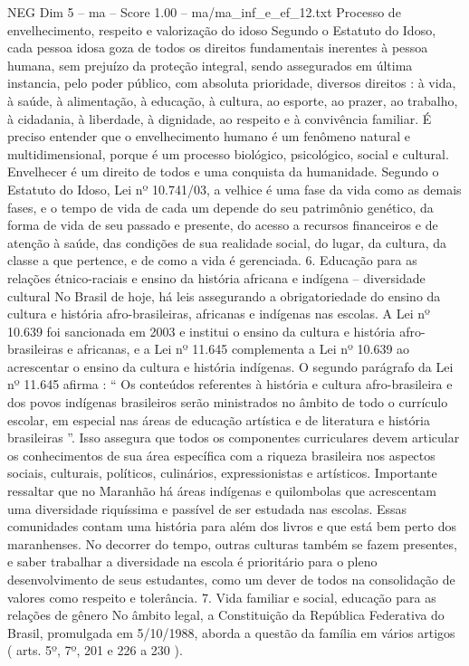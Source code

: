 \begin{textsample}{NEG Dim 5 – ma – Score 1.00 – ma/ma\_inf\_e\_ef\_12.txt}
Processo de envelhecimento, respeito e valorização do idoso Segundo o Estatuto do Idoso, cada pessoa idosa goza de todos os direitos fundamentais inerentes à pessoa humana, sem prejuízo da proteção integral, sendo assegurados em última instancia, pelo poder público, com absoluta prioridade, diversos direitos : à vida, à saúde, à alimentação, à educação, à cultura, ao esporte, ao prazer, ao trabalho, à cidadania, à liberdade, à dignidade, ao respeito e à convivência familiar.
É preciso entender que o envelhecimento humano é um fenômeno natural e multidimensional, porque é um processo biológico, psicológico, social e cultural.
Envelhecer é um direito de todos e uma conquista da humanidade.
Segundo o Estatuto do Idoso, Lei nº 10.741/03, a velhice é uma fase da vida como as demais fases, e o tempo de vida de cada um depende do seu patrimônio genético, da forma de vida de seu passado e presente, do acesso a recursos financeiros e de atenção à saúde, das condições de sua realidade social, do lugar, da cultura, da classe a que pertence, e de como a vida é gerenciada. 6.
Educação para as relações étnico-raciais e ensino da história africana e indígena – diversidade cultural No Brasil de hoje, há leis assegurando a obrigatoriedade do ensino da cultura e história afro-brasileiras, africanas e indígenas nas escolas.
A Lei nº 10.639 foi sancionada em 2003 e institui o ensino da cultura e história afro-brasileiras e africanas, e a Lei nº 11.645 complementa a Lei nº 10.639 ao acrescentar o ensino da cultura e história indígenas.
O segundo parágrafo da Lei nº 11.645 afirma : “ Os conteúdos referentes à história e cultura afro-brasileira e dos povos indígenas brasileiros serão ministrados no âmbito de todo o currículo escolar, em especial nas áreas de educação artística e de literatura e história brasileiras ”.
Isso assegura que todos os componentes curriculares devem articular os conhecimentos de sua área específica com a riqueza brasileira nos aspectos sociais, culturais, políticos, culinários, expressionistas e artísticos.
Importante ressaltar que no Maranhão há áreas indígenas e quilombolas que acrescentam uma diversidade riquíssima e passível de ser estudada nas escolas.
Essas comunidades contam uma história para além dos livros e que está bem perto dos maranhenses.
No decorrer do tempo, outras culturas também se fazem presentes, e saber trabalhar a diversidade na escola é prioritário para o pleno desenvolvimento de seus estudantes, como um dever de todos na consolidação de valores como respeito e tolerância. 7.
Vida familiar e social, educação para as relações de gênero No âmbito legal, a Constituição da República Federativa do Brasil, promulgada em 5/10/1988, aborda a questão da família em vários artigos ( arts. 5º, 7º, 201 e 226 a 230 ).

\end{textsample}
